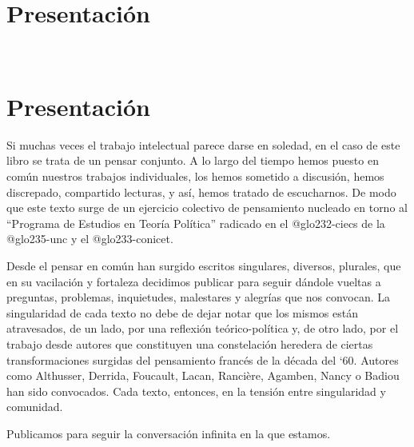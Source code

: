 \ifPDF
\chapter[\hspace{0pc}Presentación]{Presentación} %
\setcounter{PrimPag}{\theCurrentPage}

\begin{center}
	\\
	\vspace{20mm}
\end{center}
	\else
	\ifHTMLEPUB
	\chapter{Presentación}
	\fi
\fi

Si muchas veces el trabajo intelectual parece darse en soledad, en el caso de este libro se trata de un pensar conjunto. A lo largo del tiempo hemos puesto en común nuestros trabajos individuales, los hemos sometido a discusión, hemos discrepado, compartido lecturas, y así, hemos tratado de escucharnos. De modo que este texto surge de un ejercicio colectivo de pensamiento nucleado en torno al \enquote{Programa de Estudios en Teoría Política} radicado en el \gls{@glo232-ciecs} de la \gls{@glo235-unc} y el \gls{@glo233-conicet}.

Desde el pensar en común han surgido escritos singulares, diversos, plurales, que en su vacilación y fortaleza decidimos publicar para seguir dándole vueltas a preguntas, problemas, inquietudes, malestares y alegrías que nos convocan. La singularidad de cada texto no debe de dejar notar que los mismos están atravesados, de un lado, por una reflexión teórico-política y, de otro lado, por el trabajo desde autores que constituyen una constelación heredera de ciertas transformaciones surgidas del pensamiento francés de la década del `60. Autores como Althusser, Derrida, Foucault, Lacan, Rancière, Agamben, Nancy o Badiou han sido convocados. Cada texto, entonces, en la tensión entre singularidad y comunidad.

Publicamos para seguir la conversación infinita en la que estamos.

\ifPDF
{}
\fi